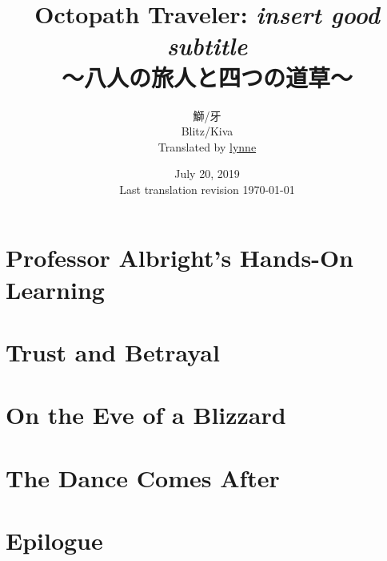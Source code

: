 \documentclass[a4paper,11pt]{memoir}
\title{%
Octopath Traveler: \emph{insert good subtitle} \\
\large{～八人の旅人と四つの道草～}
}
\author{%
鰤/牙 \\
Blitz/Kiva \\
Translated by \href{https://twitter.com/plvpwaa}{lynne}
}
\date{%
July 20, 2019 \\
Last translation revision \today
}
\begin{document}
	\maketitle
	\pagebreak
	\tableofcontents*
	\pagebreak
	\chapter{Professor Albright's Hands-On Learning}
		
	\chapter{Trust and Betrayal}
	\chapter{On the Eve of a Blizzard}
	\chapter{The Dance Comes After}
	\chapter{Epilogue}
\end{document}
